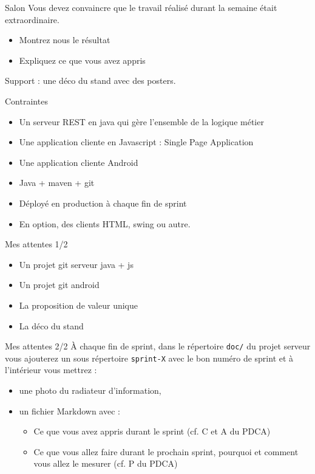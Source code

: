 \documentclass{beamer}
\begin{document}
\begin{frame}{Salon}
  Vous devez convaincre que le travail réalisé durant la semaine était extraordinaire.
  \begin{itemize}
    \item Montrez nous le résultat
    \item Expliquez ce que vous avez appris
  \end{itemize}

  Support : une déco du stand avec des posters.

\end{frame}

\begin{frame}{Contraintes}
  \begin{itemize}
    \item Un serveur REST en java qui gère l'ensemble de la logique métier
    \item Une application cliente en Javascript : Single Page Application
    \item Une application cliente Android
    \item Java + maven + git
    \item Déployé en production à chaque fin de sprint
    \item En option, des clients HTML, swing ou autre.
  \end{itemize}
\end{frame}

\begin{frame}{Mes attentes 1/2}
  \begin{itemize}
    \item Un projet git serveur java + js
    \item Un projet git android
    \item La proposition de valeur unique
    \item La déco du stand
  \end{itemize}
\end{frame}

\begin{frame}{Mes attentes 2/2}
  À chaque fin de sprint, dans le répertoire {\color{gray}\texttt{doc/}} du projet serveur vous ajouterez un sous répertoire {\color{gray}\texttt{sprint-X}} avec le bon numéro de sprint et à l'intérieur vous mettrez : 
  \begin{itemize}
    \item une photo du radiateur d'information, 
    \item un fichier Markdown avec :
    \begin{itemize}
      \item Ce que vous avez appris durant le sprint (cf. C et A du PDCA)
      \item Ce que vous allez faire durant le prochain sprint, pourquoi et comment vous allez le mesurer (cf. P du PDCA)
    \end{itemize}
  \end{itemize}
\end{frame}
\end{document}
